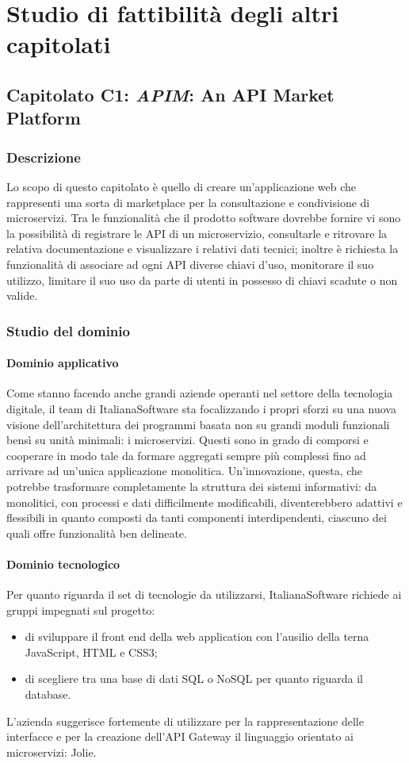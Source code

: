 \newpage

\section{Studio di fattibilità degli altri capitolati}
	\subsection{Capitolato C1: \emph{APIM}: An API Market Platform}
		\subsubsection{Descrizione}
		Lo scopo di questo capitolato è quello di creare un'applicazione web che rappresenti una sorta di marketplace per la consultazione e 
		condivisione di microservizi. Tra le funzionalità che il prodotto software dovrebbe fornire vi sono la possibilità di registrare le API 
		di un microservizio, consultarle e ritrovare la relativa documentazione e visualizzare i relativi dati tecnici; inoltre è richiesta la 
		funzionalità di associare ad ogni API diverse chiavi d'uso, monitorare il suo utilizzo, limitare il suo uso da parte di utenti in possesso 
		di chiavi scadute o non valide.
		\subsubsection{Studio del dominio}
			\paragraph{Dominio applicativo}
			Come stanno facendo anche grandi aziende operanti nel settore della tecnologia digitale, il team di ItalianaSoftware sta focalizzando i propri sforzi su una nuova visione dell'architettura 
			dei programmi basata non su grandi moduli funzionali bensì su unità minimali: i microservizi. Questi sono in grado di comporsi e cooperare in modo 
			tale da formare aggregati sempre più complessi fino ad arrivare ad un'unica applicazione monolitica. Un'innovazione, questa, che potrebbe 
			trasformare completamente la struttura dei sistemi informativi: da monolitici, con processi e dati difficilmente modificabili, diventerebbero 
			adattivi e flessibili in quanto composti da tanti componenti interdipendenti, ciascuno dei quali offre funzionalità ben delineate.
			\paragraph{Dominio tecnologico}
			Per quanto riguarda il set di tecnologie da utilizzarsi, ItalianaSoftware richiede ai gruppi impegnati sul progetto:
			\begin{itemize}
			\item di sviluppare il front end della web application con l'ausilio della terna JavaScript, HTML e CSS3;
			\item di scegliere tra una base di dati SQL o NoSQL per quanto riguarda il database.\\
			\end{itemize}
			L'azienda suggerisce fortemente di utilizzare per la rappresentazione delle interfacce e per la creazione dell'API Gateway
			il linguaggio orientato ai microservizi: Jolie.

